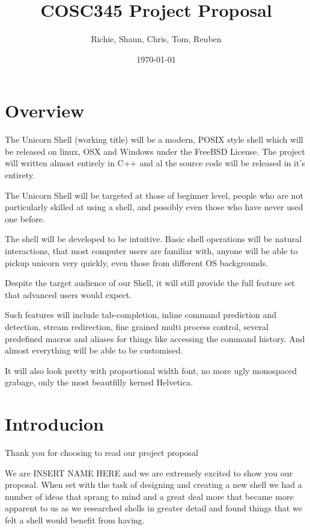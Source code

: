 \documentclass[a4paper,11pt]{article}
\title{COSC345 Project Proposal}
\author{Richie, Shaun, Chris, Tom, Reuben}
\date{\today}
\begin{document}
\maketitle

\section{Overview}

The Unicorn Shell (working title) will be a modern, POSIX style shell which will be released on linux, OSX and Windows under the FreeBSD License. The project will written almost entirely in C++ and al the source code will be released in it's entirety.

The Unicorn Shell will be targeted at those of beginner level, people who are not particularly skilled at using a shell, and possibly even those who have never used one before.

The shell will be developed to be intuitive. Basic shell operations will be natural interactions, that most computer users are familiar with, anyone will be able to pickup unicorn very quickly, even those from different OS backgrounds.

Despite the target audience of our Shell, it will still provide the full feature set that advanced users would expect.

Such features will include tab-completion, inline command prediction and detection, stream redirection, fine grained multi process control, several predefined macros and aliases for things like accessing the command history. And almost everything will be able to be customised.

It will also look pretty with proportional width font, no more ugly monospaced grabage, only the most beautfilly kerned Helvetica. 

\section{Introducion}
Thank you for choosing to read our project proposal

We are INSERT NAME HERE and we are extremely excited to show you our proposal. When set with the task of designing and creating a new shell we had a number of ideas that sprang to mind and a great deal more that became more apparent to us as we researched shells in greater detail and found things that we felt a shell would benefit from having.
\pagebreak
\end{document}
